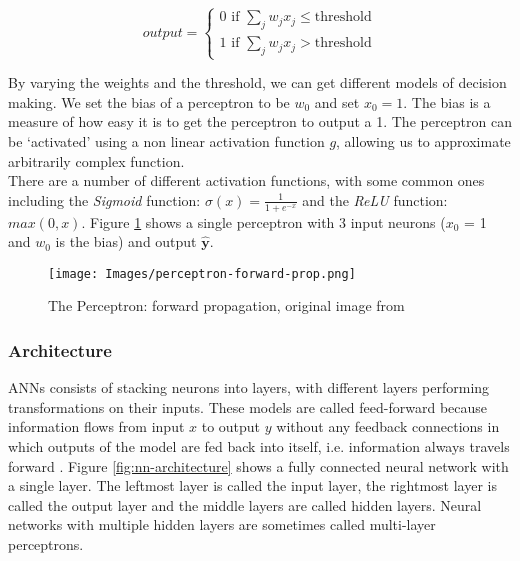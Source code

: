 \begin{equation}
    output = 
    \begin{cases} 
        0 \textrm{ if } \sum_jw_jx_j \leqslant \textrm{threshold} \\
        1 \textrm{ if } \sum_jw_jx_j > \textrm{threshold}
    \end{cases}
    \label{eq:perceptron}
\end{equation}

By varying the weights and the threshold, we can get different models of decision making. We set the bias of a perceptron to be $w_0$ and set $x_0 = 1$. The bias is a measure of how easy it is to get the perceptron to output a 1. The perceptron can be `activated' using a non linear activation function $g$, allowing us to approximate arbitrarily complex function. \\

There are a number of different activation functions, with some common ones including the \textit{Sigmoid} function: $ \sigma(x) = \frac{1}{1 + e^{-x}} $ and the \textit{ReLU} function: $ max(0, x) $. Figure \ref{fig:perceptron} shows a single perceptron with 3 input neurons ($x_0$ = 1 and $w_0$ is the bias) and output $\mathbf{\hat y}$.

\begin{figure}[H]
\begin{center}
    \texttt{[image: Images/perceptron-forward-prop.png]}
    \caption{The Perceptron: forward propagation, original image from \cite{methods-for-ds-slides}}
    \label{fig:perceptron}
\end{center}
\end{figure}

\subsubsection{Architecture}

ANNs consists of stacking neurons into layers, with different layers performing transformations on their inputs. These models are called feed-forward because information flows from input $x$ to output $y$ without any feedback connections in which outputs of the model are fed back into itself, i.e. information always travels forward \cite{deep-learning-book}. Figure \ref{fig:nn-architecture} shows a fully connected neural network with a single layer. The leftmost layer is called the input layer, the rightmost layer is called the output layer and the middle layers are called hidden layers. Neural networks with multiple hidden layers are sometimes called multi-layer perceptrons.


